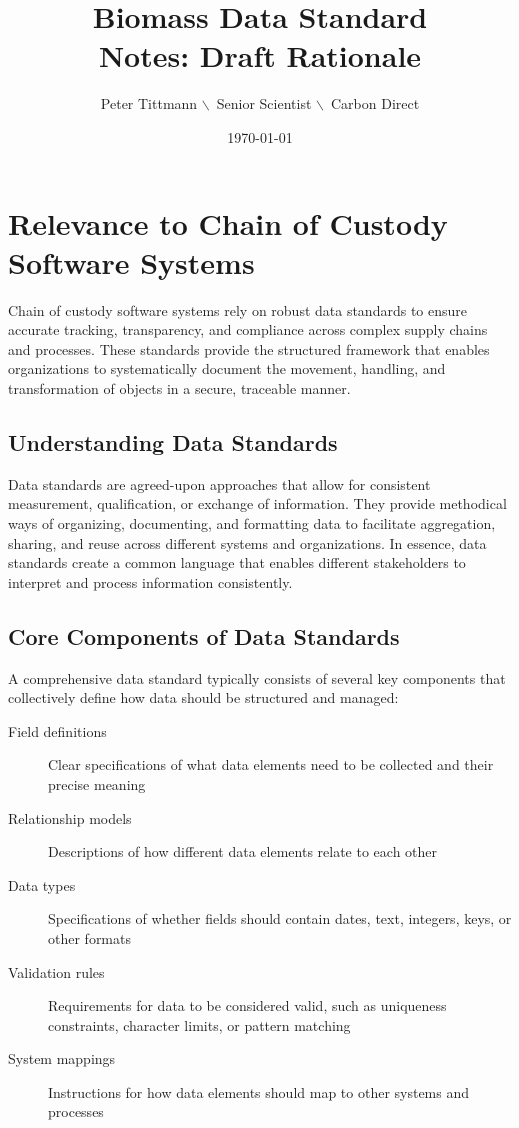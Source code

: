 \documentclass[title=small,preset=opensansnote,par=skip]{article}
\author{Peter Tittmann $\backslash$\ Senior Scientist $\backslash$\ Carbon Direct}
\date{\today}
\title{Biomass Data Standard\\\medskip
\large Notes: Draft Rationale}
\begin{document}
\maketitle
\section{Relevance to Chain of Custody Software Systems}
\label{sec:org008653c}

Chain of custody software systems rely on robust data standards to ensure accurate tracking, transparency, and compliance across complex supply chains and processes. These standards provide the structured framework that enables organizations to systematically document the movement, handling, and transformation of objects in a secure, traceable manner.
\subsection{Understanding Data Standards}
\label{sec:orgce5c934}

Data standards are agreed-upon approaches that allow for consistent measurement, qualification, or exchange of information. They provide methodical ways of organizing, documenting, and formatting data to facilitate aggregation, sharing, and reuse across different systems and organizations. In essence, data standards create a common language that enables different stakeholders to interpret and process information consistently.
\subsection{Core Components of Data Standards}
\label{sec:orgc9d55bf}

A comprehensive data standard typically consists of several key components that collectively define how data should be structured and managed:

\begin{description}
\item[{Field definitions}] Clear specifications of what data elements need to be collected and their precise meaning
\item[{Relationship models}] Descriptions of how different data elements relate to each other
\item[{Data types}] Specifications of whether fields should contain dates, text, integers, keys, or other formats
\item[{Validation rules}] Requirements for data to be considered valid, such as uniqueness constraints, character limits, or pattern matching
\item[{System mappings}] Instructions for how data elements should map to other systems and processes
\end{description}
\end{document}
